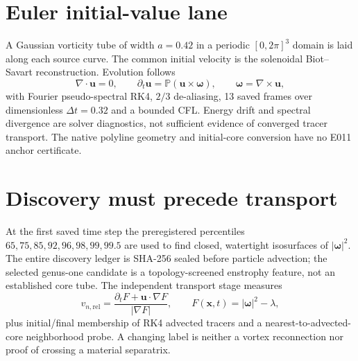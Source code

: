 \documentclass[10pt,a4paper]{article}
\begin{document}
\section{Euler initial-value lane}
A Gaussian vorticity tube of width $a=0.42$ in a periodic $[0,2\pi]^3$ domain is laid along each source curve.
The common initial velocity is the solenoidal Biot--Savart reconstruction.
Evolution follows
\begin{equation}
\nabla\!\cdot\mathbf u=0,\qquad
\partial_t\mathbf u=\mathbb P(\mathbf u\times\boldsymbol\omega),\qquad
\boldsymbol\omega=\nabla\times\mathbf u,
\end{equation}
with Fourier pseudo-spectral RK4, $2/3$ de-aliasing, 13 saved frames over dimensionless $\Delta t=0.32$ and a bounded CFL.
Energy drift and spectral divergence are solver diagnostics, not sufficient evidence of converged tracer transport.
The native polyline geometry and initial-core conversion have no E011 anchor certificate.
\section{Discovery must precede transport}
At the first saved time step the preregistered percentiles $65,75,85,92,96,98,99,99.5$
are used to find closed, watertight isosurfaces of $|\boldsymbol\omega|^2$.
The entire discovery ledger is SHA-256 sealed before particle advection; the selected genus-one candidate is a topology-screened enstrophy feature, not an established core tube.
The independent transport stage measures
\begin{equation}
v_{n,\mathrm{rel}}=\frac{\partial_tF+\mathbf u\cdot\nabla F}{|\nabla F|},\qquad
 F(\mathbf x,t)=|\boldsymbol\omega|^2-\lambda,
\end{equation}
plus initial/final membership of RK4 advected tracers and a nearest-to-advected-core neighborhood probe.
A changing label is neither a vortex reconnection nor proof of crossing a material separatrix.
\end{document}
